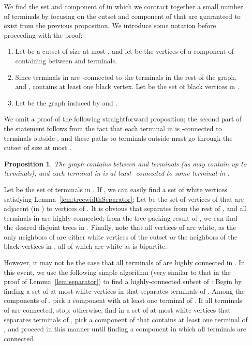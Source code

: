 \documentclass[11pt]{article}
\newtheorem{prop}[lemma]{Proposition}
\begin{document}
We find the set  and component of  in which we contract
together a small number of terminals by focusing on the cutset  and
component of  that are guaranteed to exist from the previous
proposition. We introduce some notation before proceeding with the proof:

\begin{enumerate}
\item Let  be a cutset of size at most , and let  be the
  vertices of a component of  containing between  and 
  terminals.

\item Since terminals in  are -connected to the terminals in
  the rest of the graph, and ,  contains at least
  one black vertex. Let  be the set of black vertices in .

\item Let  be the graph induced by  and .
\end{enumerate}

We omit a proof of the following straightforward proposition; the
second part of the statement follows from the fact that each terminal in
 is -connected to terminals outside , and these paths to
terminals outside  must go through the cutset  of size at most
.

\begin{prop}\label{prop:V'Connected}
  The graph  contains between  and  terminals (as  may
  contain up to  terminals), and each terminal in  is at least
  -connected to some terminal in . 
\end{prop}

Let  be the set of terminals in . If , we can easily find a set of white vertices satisfying
Lemma~\ref{lem:treewidthSeparator}: Let  be the set of vertices of
 that are adjacent (in ) to vertices of .  It is obvious
that  separates  from the rest of , and all terminals in
 are highly connected; from the tree packing result of \cite{cs},
we can find the desired disjoint trees in . Finally, note that all
vertices of  are white, as the only neighbors of  are either
white vertices of the cutset  or the neighbors of the black
vertices in , all of which are white as  is bipartite.

However, it may not be the case that all terminals of  are highly
connected in . In this event, we use the following simple
algorithm (very similar to that in the proof of
Lemma~\ref{lem:separator}) to find a highly-connected subset of :
Begin by finding a set  of at most  white vertices in
 that separates terminals of . Among the components of , pick a component  with at least one terminal of . If
all terminals of  are  connected, stop; otherwise, find
in  a set  of at most  white vertices that separates
terminals of , pick a component  of  that
contains at least one terminal of , and proceed in this manner
until finding a component  in which all terminals are 
connected.
\end{document}
